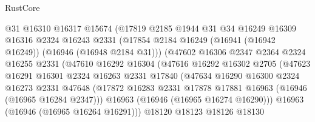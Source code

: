 \begin{lexlean}{RustCore}
\begin{coremodule}
                          @31
                          @16310
                          @16317
                          @15674
                          (@17819
                            @2185
                            @1944
                            @31
                            @34
                            @16249
                            @16309
                            @16316
                            @2324
                            @16243
                            @2331
                            (@17854
                              @2184
                              @16249
                              (@16941 (@16942 @16249))
                              (@16946 (@16948 @2184 @31)))
                            (@47602
                              @16306
                              @2347
                              @2364
                              @2324
                              @16255
                              @2331
                              (@47610
                                @16292
                                @16304
                                (@47616
                                  @16292
                                  @16302
                                  @2705
                                  (@47623
                                    @16291
                                    @16301
                                    @2324
                                    @16263
                                    @2331
                                    @17840
                                    (@47634
                                      @16290
                                      @16300
                                      @2324
                                      @16273
                                      @2331
                                      @47648
                                      (@17872
                                        @16283
                                        @2331
                                        @17878
                                        @17881
                                        @16963
                                        (@16946 (@16965 @16284 @2347)))
                                      @16963
                                      (@16946 (@16965 @16274 @16290)))
                                    @16963
                                    (@16946 (@16965 @16264 @16291)))
                                  @18120
                                  @18123
                                  @18126
                                  @18130

\end{coremodule}
\end{lexlean}
